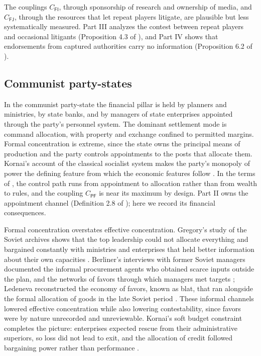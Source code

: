 \documentclass[11pt,letterpaper]{article}
\theoremstyle{definition}
\theoremstyle{remark}
\newcommand{\pF}{\mathsf{F}}
\newcommand{\pP}{\mathsf{P}}
\newcommand{\pJ}{\mathsf{J}}
\newcommand{\pI}{\mathsf{I}}
\begin{document}
The couplings $C_{\pF\pI}$, through sponsorship of research and ownership of media, and $C_{\pF\pJ}$, through the resources that let repeat players litigate, are plausible but less systematically measured. Part III analyzes the contest between repeat players and occasional litigants (Proposition 4.3 of \citealt{long2026judicial}), and Part IV shows that endorsements from captured authorities carry no information (Proposition 6.2 of \citealt{long2026ideological}).

\subsection{Communist party-states}

In the communist party-state the financial pillar is held by planners and ministries, by state banks, and by managers of state enterprises appointed through the party's personnel system. The dominant settlement mode is command allocation, with property and exchange confined to permitted margins. Formal concentration is extreme, since the state owns the principal means of production and the party controls appointments to the posts that allocate them. Kornai's account of the classical socialist system makes the party's monopoly of power the defining feature from which the economic features follow \citep{kornai1992}. In the terms of \citet{largo2026hbs}, the control path runs from appointment to allocation rather than from wealth to rules, and the coupling $C_{\pP\pF}$ is near its maximum by design. Part II owns the appointment channel (Definition 2.8 of \citealt{long2026political}); here we record its financial consequences.

Formal concentration overstates effective concentration. Gregory's study of the Soviet archives shows that the top leadership could not allocate everything and bargained constantly with ministries and enterprises that held better information about their own capacities \citep{gregory2004}. Berliner's interviews with former Soviet managers documented the informal procurement agents who obtained scarce inputs outside the plan, and the networks of favors through which managers met targets \citep{berliner1957}; Ledeneva reconstructed the economy of favors, known as blat, that ran alongside the formal allocation of goods in the late Soviet period \citep{ledeneva1998}. These informal channels lowered effective concentration while also lowering contestability, since favors were by nature unrecorded and unreviewable. Kornai's soft budget constraint completes the picture: enterprises expected rescue from their administrative superiors, so loss did not lead to exit, and the allocation of credit followed bargaining power rather than performance \citep{kornai1986}.
\end{document}
